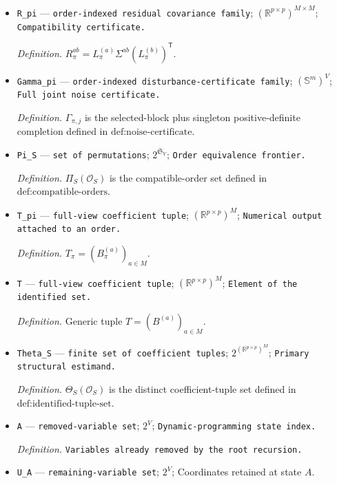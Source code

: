 \documentclass{article}
\begin{document}
\begin{itemize}
  \item \texttt{R\_\allowbreak{}pi} --- \texttt{order-\allowbreak{}indexed residual covariance family}; \((\mathbb R^{p\times p})^{M\times M}\); \texttt{Compatibility certificate.}
  \par\smallskip\noindent\emph{Definition.} \(R_\pi^{ab}=L_\pi^{(a)}\Sigma^{ab}(L_\pi^{(b)})^{\mathsf T}\).
  \item \texttt{Gamma\_\allowbreak{}pi} --- \texttt{order-\allowbreak{}indexed disturbance-\allowbreak{}certificate family}; \((\mathbb S^m)^V\); \texttt{Full joint noise certificate.}
  \par\smallskip\noindent\emph{Definition.} \(\Gamma_{\pi,j}\) is the selected-block plus singleton positive-definite completion defined in \(\text{def:noise-certificate}\).
  \item \texttt{Pi\_\allowbreak{}S} --- \texttt{set of permutations}; \(2^{\mathfrak S_V}\); \texttt{Order equivalence frontier.}
  \par\smallskip\noindent\emph{Definition.} \(\Pi_S(\mathcal O_S)\) is the compatible-order set defined in \(\text{def:compatible-orders}\).
  \item \texttt{T\_\allowbreak{}pi} --- \texttt{full-\allowbreak{}view coefficient tuple}; \((\mathbb R^{p\times p})^M\); \texttt{Numerical output attached to an order.}
  \par\smallskip\noindent\emph{Definition.} \(T_\pi=(B_\pi^{(a)})_{a\in M}\).
  \item \texttt{T} --- \texttt{full-\allowbreak{}view coefficient tuple}; \((\mathbb R^{p\times p})^M\); \texttt{Element of the identified set.}
  \par\smallskip\noindent\emph{Definition.} Generic tuple \(T=(B^{(a)})_{a\in M}\).
  \item \texttt{Theta\_\allowbreak{}S} --- \texttt{finite set of coefficient tuples}; \(2^{(\mathbb R^{p\times p})^M}\); \texttt{Primary structural estimand.}
  \par\smallskip\noindent\emph{Definition.} \(\Theta_S(\mathcal O_S)\) is the distinct coefficient-tuple set defined in \(\text{def:identified-tuple-set}\).
  \item \texttt{A} --- \texttt{removed-\allowbreak{}variable set}; \(2^V\); \texttt{Dynamic-\allowbreak{}programming state index.}
  \par\smallskip\noindent\emph{Definition.} \texttt{Variables already removed by the root recursion.}
  \item \texttt{U\_\allowbreak{}A} --- \texttt{remaining-\allowbreak{}variable set}; \(2^V\); Coordinates retained at state \(A\).

\end{itemize}
\end{document}
